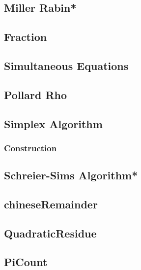 \subsection{Miller Rabin*} %

% 
\subsection{Fraction}

\subsection{Simultaneous Equations}

\subsection{Pollard Rho}

\subsection{Simplex Algorithm}

\subsubsection{Construction}

\subsection{Schreier-Sims Algorithm*} %

\subsection{chineseRemainder}

\subsection{QuadraticResidue}

\subsection{PiCount}

